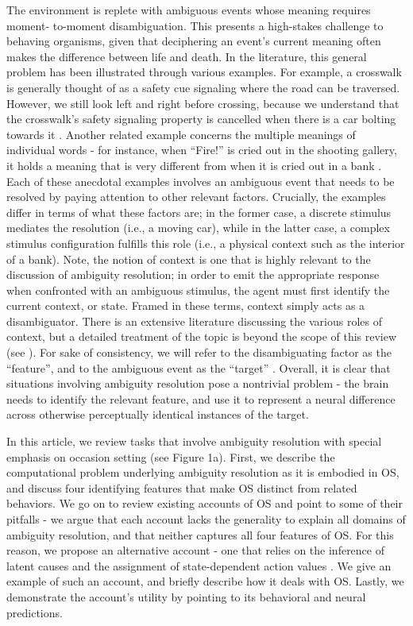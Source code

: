 \documentclass[11pt]{article}
\let\cite=\citep
\let\citeNP=\citealt
\begin{document}
The environment is replete with ambiguous events whose meaning requires moment-
to-moment disambiguation. This presents a high-stakes challenge to behaving 
organisms, given that deciphering an event's current meaning often makes the 
difference between life and death. In the literature, this general problem has 
been illustrated through various examples. For example, a crosswalk is 
generally thought of as a safety cue signaling where the road can be traversed. 
However, we still look left and right before crossing, because we understand 
that the crosswalk's safety signaling property is cancelled when there is a car 
bolting towards it \cite{Meyer2016}. Another related example concerns the 
multiple meanings of individual words - for instance, when ``Fire!'' is cried 
out in the shooting gallery, it holds a meaning that is very different from 
when it is cried out in a bank \cite{Bouton1994}. Each of these anecdotal 
examples involves an ambiguous event that needs to be resolved by paying 
attention to other relevant factors. Crucially, the examples differ in terms of 
what these factors are; in the former case, a discrete stimulus mediates the 
resolution (i.e., a moving car), while in the latter case, a complex stimulus 
configuration fulfills this role (i.e., a physical context such as the interior 
of a bank). Note, the notion of context is one that is highly relevant to the 
discussion of ambiguity resolution; in order to emit the appropriate response 
when confronted with an ambiguous stimulus, the agent must first identify the 
current context, or state. Framed in these terms, context simply acts as a 
disambiguator. There is an extensive literature discussing the various roles of 
context, but a detailed treatment of the topic is beyond the scope of this 
review (see \citeNP{Bouton1994,Bouton2004,OKeefe1978,Nadel1980,Rudy2009}). For 
sake of consistency, we will refer to the disambiguating factor as the 
``feature'', and to the ambiguous event as the ``target'' \cite{Bouton2007}. 
Overall, it is clear that situations involving ambiguity resolution pose a 
nontrivial problem - the brain needs to identify the relevant feature, and use 
it to represent a neural difference across otherwise perceptually identical 
instances of the target. 

In this article, we review tasks that involve ambiguity resolution with special 
emphasis on occasion setting (see Figure 1a). First, we describe the 
computational problem underlying ambiguity resolution as it is embodied in OS, 
and discuss four identifying features that make OS distinct from related 
behaviors. We go on to review existing accounts of OS and point to some of 
their pitfalls - we argue that each account lacks the generality to explain all 
domains of ambiguity resolution, and that neither captures all four features of 
OS. For this reason, we propose an alternative account - one that relies on the 
inference of latent causes and the assignment of state-dependent action values 
\cite{Gershman2012}. We give an example of such an account, and briefly 
describe how it deals with OS. Lastly, we demonstrate the account's utility by 
pointing to its behavioral and neural predictions. 
\end{document}
